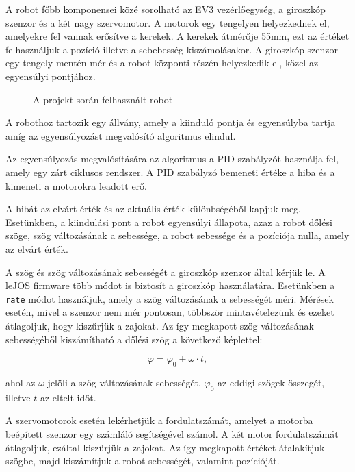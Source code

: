 A robot főbb komponensei közé sorolható az EV3 vezérlőegység, a giroszkóp szenzor és a két nagy szervomotor. A motorok egy tengelyen helyezkednek el, amelyekre fel vannak erősítve a kerekek. A kerekek átmérője 55mm, ezt az értéket felhasználjuk a pozíció illetve a sebebesség kiszámolásakor. A giroszkóp szenzor egy tengely mentén mér és a robot központi részén helyezkedik el, közel az egyensúlyi pontjához.

\begin{figure}[!htb]
	\centering
	\caption{A projekt során felhasznált robot}
	\label{fig:gyro_boy}
\end{figure}

A robothoz tartozik egy állvány, amely a kiinduló pontja és egyensúlyba tartja amíg az egyensúlyozást megvalósító algoritmus elindul. 

Az egyensúlyozás megvalósítására az algoritmus a PID szabályzót használja fel, amely egy zárt ciklusos rendszer. A PID szabályzó bemeneti értéke a hiba és a kimeneti a motorokra leadott erő.

A hibát az elvárt érték és az aktuális érték különbségéből kapjuk meg. Esetünkben, a kiindulási pont a robot egyensúlyi állapota, azaz a robot dőlési szöge, szög változásának a sebessége, a robot sebessége és a pozíciója nulla, amely az elvárt érték. 

A szög és szög változásának sebességét a giroszkóp szenzor által kérjük le. A leJOS firmware több módot is biztosít a giroszkóp használatára. Esetünkben a \texttt{rate} módot használjuk, amely a szög változásának a sebességét méri. Mérések esetén, mivel a szenzor nem mér pontosan, többször mintavételezünk és ezeket átlagoljuk, hogy kiszűrjük a zajokat. Az így megkapott szög változásának sebességéből kiszámítható a dőlési szög a következő képlettel: 

\begin{equation} \label{szog}
\varphi=\varphi_{0}+\omega \cdot t,
\end{equation}

ahol az $\omega$ jelöli a szög változásának sebességét, $\varphi_{0}$ az eddigi szögek összegét, illetve $t$ az eltelt időt.

A szervomotorok esetén lekérhetjük a fordulatszámát, amelyet a motorba beépített szenzor egy számláló segítségével számol. A két motor fordulatszámát átlagoljuk, ezáltal kiszűrjük a zajokat. Az így megkapott értéket átalakítjuk szögbe, majd kiszámítjuk a robot sebességét, valamint pozícióját.

